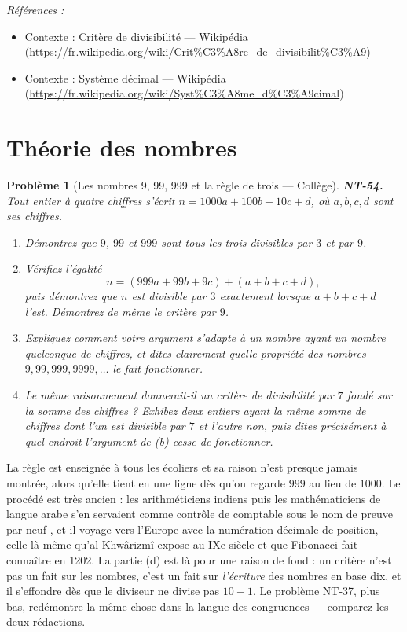 \documentclass[11pt]{article}
\newtheorem{problem}{Problème}
\newenvironment{refs}{\par\small\noindent\emph{Références :}\begin{itemize}\setlength\itemsep{0pt}}{\end{itemize}\normalsize}
\begin{document}
\begin{refs}
\item Contexte : Critère de divisibilité --- Wikipédia (\url{https://fr.wikipedia.org/wiki/Crit%C3%A8re_de_divisibilit%C3%A9})
\item Contexte : Système décimal --- Wikipédia (\url{https://fr.wikipedia.org/wiki/Syst%C3%A8me_d%C3%A9cimal})
\end{refs}

\bigskip


\section*{Théorie des nombres}

\begin{problem}[{Les nombres 9, 99, 999 et la règle de trois --- Collège}]
\textbf{NT-54.} Tout entier à quatre chiffres s'écrit $ n = 1000a + 100b + 10c + d $, où
$ a, b, c, d $ sont ses chiffres.
\begin{enumerate}
\item[(a)] Démontrez que $ 9 $, $ 99 $ et $ 999 $ sont tous les trois divisibles par $ 3 $ et par
$ 9 $.
\item[(b)] Vérifiez l'égalité
\[ n = (999a + 99b + 9c) + (a + b + c + d) , \]
puis démontrez que $ n $ est divisible par $ 3 $ exactement lorsque $ a + b + c + d $ l'est.
Démontrez de même le critère par $ 9 $.
\item[(c)] Expliquez comment votre argument s'adapte à un nombre ayant un nombre quelconque de chiffres, et
dites clairement quelle propriété des nombres $ 9, 99, 999, 9999, \ldots $ le fait fonctionner.
\item[(d)] Le même raisonnement donnerait-il un critère de divisibilité par $ 7 $ fondé sur la somme des
chiffres ? Exhibez deux entiers ayant la même somme de chiffres dont l'un est divisible par $ 7 $ et
l'autre non, puis dites précisément à quel endroit l'argument de (b) cesse de fonctionner.
\end{enumerate}

\end{problem}

\noindent La règle est enseignée à tous les écoliers et sa raison n'est presque jamais
montrée, alors qu'elle tient en une ligne dès qu'on regarde $ 999 $ au lieu de $ 1000 $. Le
procédé est très ancien : les arithméticiens indiens puis les mathématiciens de langue arabe s'en
servaient comme contrôle de comptable sous le nom de \og{} preuve par neuf \fg{}, et il voyage vers l'Europe
avec la numération décimale de position, celle-là même qu'al-Khwârizmî expose au IXe siècle
et que Fibonacci fait connaître en 1202. La partie (d) est là pour une raison de fond : un critère
n'est pas un fait sur les nombres, c'est un fait sur \textit{l'écriture} des nombres en base dix, et il
s'effondre dès que le diviseur ne divise pas $ 10 - 1 $. Le problème NT-37, plus bas, redémontre la
même chose dans la langue des congruences --- comparez les deux rédactions.
\end{document}
